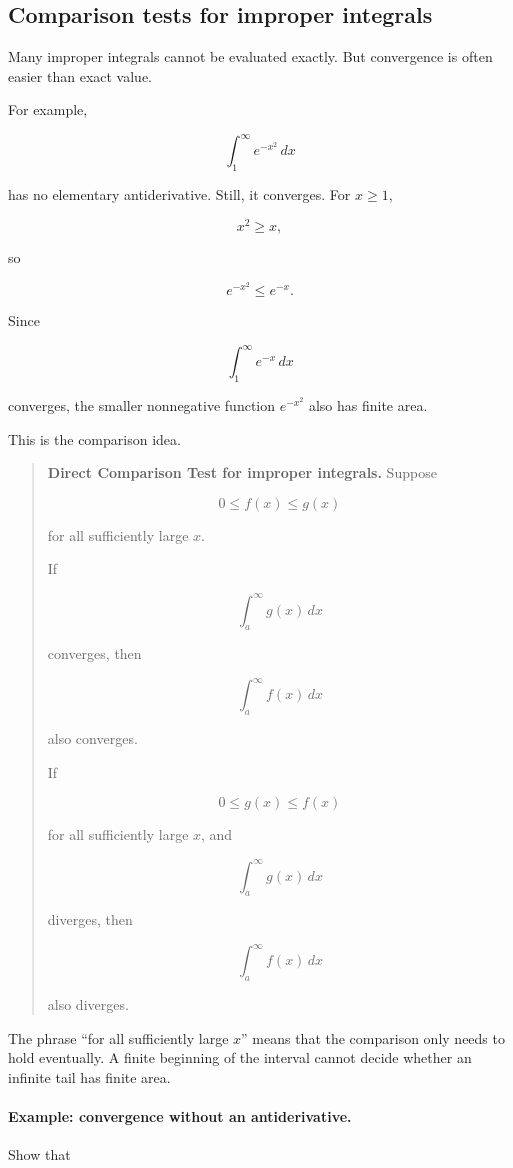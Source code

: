 \subsection{Comparison tests for improper integrals}
\label{subsec:comparison-tests-improper-integrals}

Many improper integrals cannot be evaluated exactly.  But convergence is often easier
than exact value.

For example,

\[
\int_1^\infty e^{-x^2}\,dx
\]

has no elementary antiderivative.  Still, it converges.  For \(x\ge1\),

\[
x^2\ge x,
\]

so

\[
e^{-x^2}\le e^{-x}.
\]

Since

\[
\int_1^\infty e^{-x}\,dx
\]

converges, the smaller nonnegative function \(e^{-x^2}\) also has finite area.

This is the comparison idea.

\begin{quote}
\textbf{Direct Comparison Test for improper integrals.}
Suppose

\[
0\le f(x)\le g(x)
\]

for all sufficiently large \(x\).

If

\[
\int_a^\infty g(x)\,dx
\]

converges, then

\[
\int_a^\infty f(x)\,dx
\]

also converges.

If

\[
0\le g(x)\le f(x)
\]

for all sufficiently large \(x\), and

\[
\int_a^\infty g(x)\,dx
\]

diverges, then

\[
\int_a^\infty f(x)\,dx
\]

also diverges.
\end{quote}

The phrase ``for all sufficiently large \(x\)'' means that the comparison only needs to
hold eventually.  A finite beginning of the interval cannot decide whether an infinite
tail has finite area.

\paragraph{Example: convergence without an antiderivative.}
Show that

